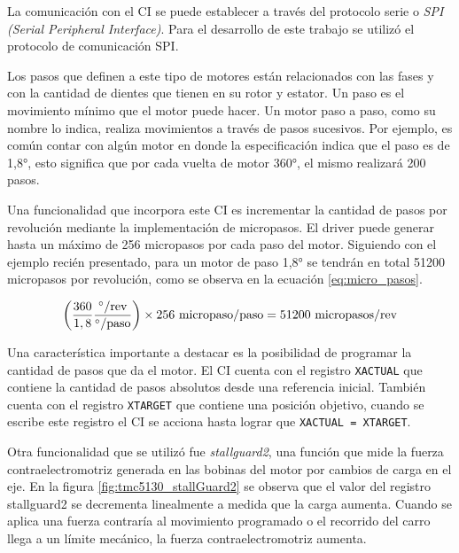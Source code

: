 La comunicación con el CI se puede establecer a través del protocolo serie o \textit{SPI (Serial Peripheral Interface)}. Para el desarrollo de este trabajo se utilizó el protocolo de comunicación SPI.

Los pasos que definen a este tipo de motores están relacionados con las fases y con la cantidad de dientes que tienen en su rotor y estator. Un paso es el movimiento mínimo que el motor puede hacer. Un motor paso a paso, como su nombre lo indica, realiza movimientos a través de pasos sucesivos. Por ejemplo, es común contar con algún motor en donde la especificación indica que el paso es de \ang{1,8}, esto significa que por cada vuelta de motor \ang{360}, el mismo realizará 200 pasos.

Una funcionalidad que incorpora este CI es incrementar la cantidad de pasos por revolución mediante la implementación de micropasos. El driver puede generar hasta un máximo de 256 micropasos por cada paso del motor. Siguiendo con el ejemplo recién presentado, para un motor de paso \ang{1,8} se tendrán en total 51200 micropasos por revolución, como se observa en la ecuación \ref{eq:micro_pasos}.

\begin{equation}
	\label{eq:micro_pasos}
		\left( \frac{360}{1,8} \frac{^\circ/\textup{rev}}{^\circ/\textup{paso}}\right) \times 256 \textup{ micropaso/paso} = 51200 \textup{ micropasos/rev}
\end{equation}


Una característica importante a destacar es la posibilidad de programar la cantidad de pasos que da el motor. El CI cuenta con el registro \verb|XACTUAL| que contiene la cantidad de pasos absolutos desde una referencia inicial. También cuenta con el registro \verb|XTARGET| que contiene una posición objetivo, cuando se escribe este registro el CI se acciona hasta lograr que \verb|XACTUAL = XTARGET|.


Otra funcionalidad que se utilizó fue \textit{stallguard2}, una función que mide la fuerza contraelectromotriz generada en las bobinas del motor por cambios de carga en el eje. En la figura \ref{fig:tmc5130_stallGuard2} se observa que el valor del registro stallguard2 se decrementa linealmente a medida que la carga aumenta. Cuando se aplica una fuerza contraría al movimiento programado o el recorrido del carro llega a un límite mecánico, la fuerza contraelectromotriz aumenta. 

